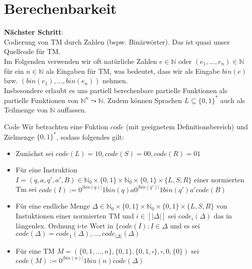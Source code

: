 
\section{Berechenbarkeit}

\textbf{Nächster Schritt}: \\
Codierung von TM durch Zahlen (bspw. Binärwörter). Das ist quasi unser Quellcode für TM. \\
Im Folgenden verwenden wir oft natürliche Zahlen $e \in \mathbb{N}$ oder $(e_1,...,e_n) \in \mathbb{N}$ 
für ein $n \in \mathbb{N}$ als Eingaben für TM, was bedeutet, dass wir als Eingabe $bin(e)$ 
bzw. $(bin(e_1),...,bin(e_n))$ nehmen. \\

Insbesondere erlaubt es uns partiell berechenbare partielle Funktionen als partielle Funktionen von $\mathbb{N}^n \leadsto \mathbb{N}$.
Zudem können Sprachen $L \subseteq \{0,1\}^*$ auch als Teilmenge von $\mathbb{N}$ auffassen.

\begin{defn}{Code}
    Wir betrachten eine Fuktion $code$ (mit geeignetem Definitionsbereich) und Zielmenge $\{0,1\}^*$, sodass folgendes gilt:
    \begin{itemize}
        \item Zunächst sei $code(L)=10, code(S)=00, code(R)=01$
        \item Für eine Instruktion $I = (q,a,q',a',B) \in \mathbb{N}_0 \times \{0,1\} \times \mathbb{N}_0 \times \{0,1\} \times \{L,S,R\}$
              einer normierten Tm sei $code(I) := 0^{\vert bin(q) \vert} 1bin(q) a 0^{\vert bin(q')\vert} 1bin(q') a' code(B)$
        \item Für eine endliche Menge $\Delta \in \mathbb{N}_0 \times \{0,1\} \times \mathbb{N}_0 \times \{0,1\} \times \{L,S,R\}$ von Instuktionen einer
              normierten TM und $i \in [\vert \Delta \vert]$ sei $code_i(\Delta)$ das in längenlex. Ordnung i-te Wort in 
              $\{code(I) : I \in \Delta$ und es sei $code(\Delta) = code_1(\Delta),...,code_{\vert \Delta \vert}(\Delta)$
        \item Für eine TM $M= (\{0,1,...,n\},\{0,1\},\{0,1,\square\},\square,0,\{0\})$ sei $code(M) := 0^{\vert bin(n) \vert} 1bin(n) code(\Delta)$ 
    \end{itemize}
\end{defn}

